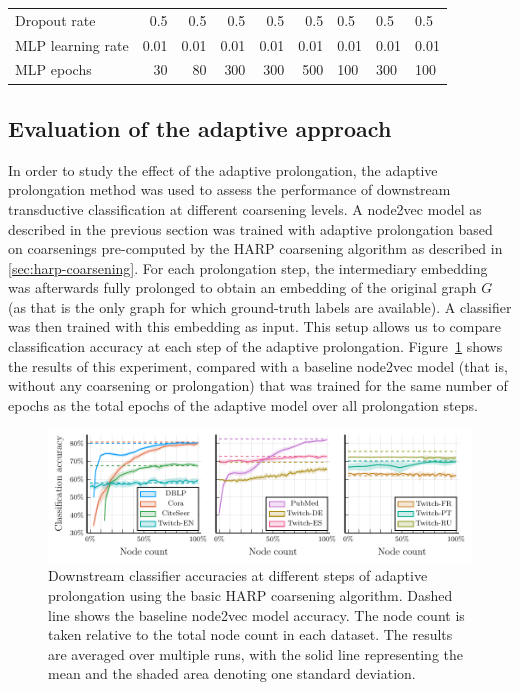 \begin{table}
\begin{tabular}{lrrrrr}
    Dropout rate             & 0.5           & 0.5               & 0.5             & 0.5           & 0.5             & 0.5           & 0.5            & 0.5               \\
    MLP learning rate        & 0.01          & 0.01              & 0.01            & 0.01          & 0.01            & 0.01          & 0.01           & 0.01              \\
    MLP epochs               & 30            & 80                & 300             & 300           & 500             & 100           & 300            & 100               \\
    \bottomrule
  \end{tabular}
\end{table}

\subsection{Evaluation of the adaptive approach}\label{sec:adaptive-experiments}

In order to study the effect of the adaptive prolongation, the adaptive prolongation method was used to assess the performance of downstream transductive classification at different coarsening levels. A node2vec model as described in the previous section was trained with adaptive prolongation based on coarsenings pre-computed by the HARP coarsening algorithm as described in \ref{sec:harp-coarsening}. For each prolongation step, the intermediary embedding was afterwards fully prolonged to obtain an embedding of the original graph \( G \) (as that is the only graph for which ground-truth labels are available). A classifier was then trained with this embedding as input. This setup allows us to compare classification accuracy at each step of the adaptive prolongation. Figure~\ref{fig:adaptive-coarsening} shows the results of this experiment, compared with a baseline node2vec model (that is, without any coarsening or prolongation) that was trained for the same number of epochs as the total epochs of the adaptive model over all prolongation steps.

\begin{figure}
  \centering
  \includegraphics[width = \linewidth]{images/adaptive-coarsening/adaptive-coarsening.pdf}
  \caption{Downstream classifier accuracies at different steps of adaptive prolongation using the basic HARP coarsening algorithm. Dashed line shows the baseline node2vec model accuracy. The node count is taken relative to the total node count in each dataset. The results are averaged over multiple runs, with the solid line representing the mean and the shaded area denoting one standard deviation.}
  \label{fig:adaptive-coarsening}
\end{figure}

